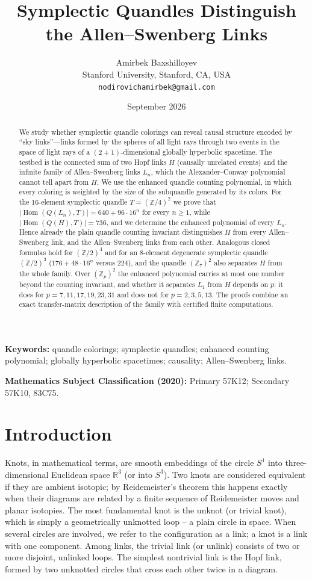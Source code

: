 \documentclass[11pt]{article}
\title{Symplectic Quandles Distinguish the Allen--Swenberg Links}
\author{Amirbek Baxshilloyev\\
Stanford University, Stanford, CA, USA\\
\texttt{nodirovichamirbek@gmail.com}}
\date{September 2026}
\theoremstyle{definition}
\newcommand{\Z}{\mathbb{Z}}
\newcommand{\R}{\mathbb{R}}
\newcommand{\Hom}{\operatorname{Hom}}
\begin{document}
\maketitle

\begin{abstract}
We study whether symplectic quandle colorings can reveal causal structure encoded by
``sky links''---links formed by the spheres of all light rays through two events in the
space of light rays of a $(2+1)$-dimensional globally hyperbolic spacetime. The testbed is the
connected sum of two Hopf links $H$ (causally unrelated events) and the infinite family of
Allen--Swenberg links $L_n$, which the Alexander--Conway polynomial cannot tell apart from $H$.
We use the enhanced quandle counting polynomial, in which every coloring is weighted by the size
of the subquandle generated by its colors. For the $16$-element symplectic quandle $T=(\Z/4)^2$ we
prove that $|\Hom(Q(L_n),T)| = 640 + 96\cdot 16^{n}$ for every $n\ge 1$, while
$|\Hom(Q(H),T)|=736$, and we determine the enhanced polynomial of every $L_n$. Hence already the plain quandle
counting invariant distinguishes $H$ from every Allen--Swenberg link, and the Allen--Swenberg links
from each other. Analogous closed formulas hold for $(\Z/2)^4$ and for an $8$-element degenerate
symplectic quandle $(\Z/2)^3$ ($176+48\cdot16^n$ versus $224$), and the quandle $(\Z_7)^2$ also separates
$H$ from the whole family. Over $(\Z_p)^2$ the enhanced polynomial carries at most one number beyond
the counting invariant, and whether it separates $L_1$ from $H$ depends on $p$: it does for
$p=7,11,17,19,23,31$ and does not for $p=2,3,5,13$. The proofs combine an exact transfer-matrix
description of the family with certified finite computations.
\end{abstract}

\noindent\textbf{Keywords:} quandle colorings; symplectic quandles; enhanced counting polynomial;
globally hyperbolic spacetimes; causality; Allen--Swenberg links.

\noindent\textbf{Mathematics Subject Classification (2020):} Primary 57K12;
Secondary 57K10, 83C75.

\section{Introduction}\label{sec:intro}

Knots, in mathematical terms, are smooth embeddings of the circle $S^1$ into three-dimensional
Euclidean space $\R^3$ (or into $S^3$). Two knots are considered equivalent if they are ambient
isotopic; by Reidemeister's theorem this happens exactly when their diagrams are related by a
finite sequence of Reidemeister moves and planar isotopies. The most fundamental knot is the unknot
(or trivial knot), which is simply a geometrically unknotted loop -- a plain circle in space. When
several circles are involved, we refer to the configuration as a link; a knot is a link with one
component. Among links, the trivial link (or unlink) consists of two or more disjoint, unlinked
loops. The simplest nontrivial link is the Hopf link, formed by two unknotted circles that cross each
other twice in a diagram.
\end{document}
